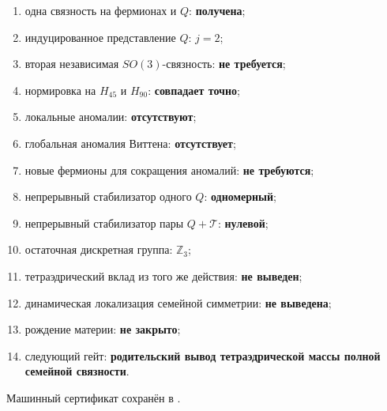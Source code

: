 \begin{protocol}
\begin{enumerate}
 \item одна связность на фермионах и $Q$: \textbf{получена};
 \item индуцированное представление $Q$: \textbf{$j=2$};
 \item вторая независимая $SO(3)$-связность: \textbf{не требуется};
 \item нормировка на $H_{45}$ и $H_{90}$: \textbf{совпадает точно};
 \item локальные аномалии: \textbf{отсутствуют};
 \item глобальная аномалия Виттена: \textbf{отсутствует};
 \item новые фермионы для сокращения аномалий: \textbf{не требуются};
 \item непрерывный стабилизатор одного $Q$: \textbf{одномерный};
 \item непрерывный стабилизатор пары $Q+\mathcal T$: \textbf{нулевой};
 \item остаточная дискретная группа: \textbf{$\mathbb Z_3$};
 \item тетраэдрический вклад из того же действия: \textbf{не выведен};
 \item динамическая локализация семейной симметрии: \textbf{не выведена};
 \item рождение материи: \textbf{не закрыто};
 \item следующий гейт: \textbf{родительский вывод тетраэдрической массы
 полной семейной связности}.
\end{enumerate}
\end{protocol}

Машинный сертификат сохранён в
.